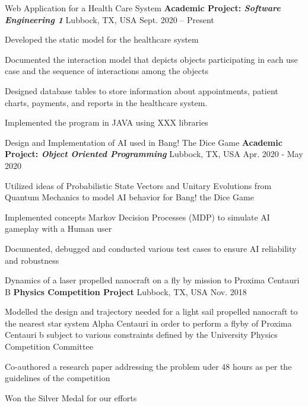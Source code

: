 \begin{cventries}
  \cventry
  {Web Application for a Health Care System}
  {\textbf{Academic Project: \textit{Software Engineering 1}}}
    {Lubbock, TX, USA}
    {Sept. 2020 -- Present}
    {
      \begin{cvitems}
      \item{Developed the static model for the healthcare system}
    \item{Documented the interaction model that depicts objects participating in each use case and the sequence of interactions among the objects}
    \item{Designed database tables to store information about appointments, patient charts, payments, and reports in the healthcare system.}
    \item{Implemented the program in JAVA using XXX libraries}
      \end{cvitems}
    }

  \cventry
  {Design and Implementation of AI used in Bang! The Dice Game}
  {\textbf{Academic Project: \textit{Object Oriented Programming}}}
    {Lubbock, TX, USA}
    {Apr. 2020 - May 2020}
    {
      \begin{cvitems}
      \item{Utilized ideas of Probabilistic State Vectors and Unitary Evolutions from Quantum Mechanics to model AI behavior for Bang! the Dice Game}
      \item{Implemented concepts Markov Decision Processes (MDP) to simulate AI gameplay with a Human user}
      \item{Documented, debugged and conducted various test cases to ensure AI reliability and robustness}
      \end{cvitems}
    }

  \cventry
  {Dynamics of a laser propelled nanocraft on a fly by mission to Proxima Centauri B}
  {\textbf{Physics Competition Project}}
    {Lubbock, TX, USA}
    {Nov. 2018}
    {
      \begin{cvitems}
      \item{Modelled the design and trajectory needed for a light sail propelled nanocraft to the nearest star system Alpha Centauri in order to perform a flyby of Proxima Centauri b subject to various constraints defined by the University Physics Competition Committee}
      \item{Co-authored a research paper addressing the problem uder 48 hours as per the guidelines of the competition}
     \item{Won the Silver Medal for our efforts}
      \end{cvitems}
    }


\end{cventries}
